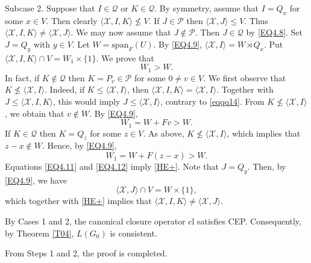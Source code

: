 \documentclass[12pt]{article}
\def\QEDopen{{\setlength{\fboxsep}{0pt}\setlength{\fboxrule}{0.2pt}\fbox{\rule[0pt]{0pt}{1.3ex}\rule[0pt]{1.3ex}{0pt}}}}
\def\QED{\QEDopen}
\def\endproof{\hspace*{\fill}~\QED\par\endtrivlist\unskip}
\begin{document}
Subcase 2. Suppose that $I\in \mathcal{Q}$ or $K\in \mathcal{Q}$. By symmetry, assume that $I=Q_x$ for some $x\in V$. 
Then clearly $\langle \mathcal{X},I,K\rangle\nleq V$. 
If $J\in \mathcal{P}$ then $\langle \mathcal{X},J\rangle\leq V$. Thus $\langle \mathcal{X},I,K\rangle\neq \langle \mathcal{X},J\rangle$. We may now assume that $J\notin \mathcal{P}$. Then
$J\in \mathcal{Q}$ by \eqref{EQ4.8}. Set $J=Q_y$ with $y\in V$. 
Let $W=\mbox{span}_{F}(U)$. By \eqref{EQ4.9}, 
$\langle \mathcal{X},I\rangle=W\rtimes Q_x$.   
Put $\langle \mathcal{X},I, K\rangle\cap V=W_1\times \{1\}$. We prove that 
\begin{equation}\label{HE+}W_1>W.\end{equation} 
In fact, if $K\notin \mathcal{Q}$ then $K=P_v\in \mathcal{P}$ 
for some $0\neq v\in V$. 
We first observe that $K\nleq \langle \mathcal{X},I\rangle.$
Indeed, if $K\leq \langle \mathcal{X},I\rangle$, then
$\langle \mathcal{X},I,K\rangle=\langle \mathcal{X},I\rangle$.
Together with $J\leq\langle \mathcal{X},I,K\rangle$, this would imply
$J\leq\langle\mathcal{X},I\rangle$, contrary to \eqref{eqqq14}.
From $K\nleq \langle \mathcal{X},I\rangle$, we obtain that $v\notin W$.
By \eqref{EQ4.9}, 
\begin{equation}\label{EQ4.11}
W_1=W+Fv>W.   
\end{equation}
If $K\in \mathcal{Q}$ then $K=Q_z$ for some $z\in V$. As above, 
$K\nleq \langle \mathcal{X},I\rangle$, which implies that $z-x\notin W$.
Hence, by \eqref{EQ4.9}, 
\begin{equation}\label{EQ4.12}
W_1=W+F(z-x)>W.   
\end{equation}
Equations \eqref{EQ4.11} and \eqref{EQ4.12} imply \eqref{HE+}. 
Note that $J=Q_y$. Then, by \eqref{EQ4.9}, we have 
$$\langle \mathcal{X},J\rangle\cap V=W\times\{1\},$$ which together with \eqref{HE+} 
implies that $\langle \mathcal{X},I,K\rangle\neq \langle \mathcal{X},J\rangle$.

By Cases 1 and 2, the canonical closure operator $\mbox{cl}$ satisfies CEP. Consequently, by Theorem \ref{T04}, 
$L(G_0)$ is consistent. 

From Steps 1 and 2, the proof is completed. 
\endproof
\end{document}
